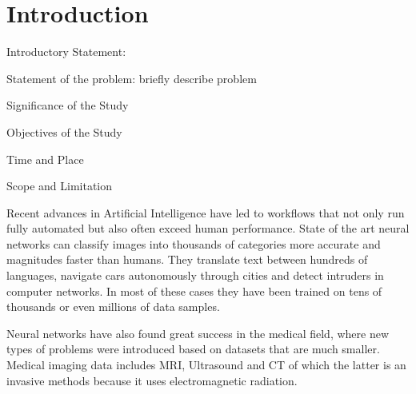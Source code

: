 \section{Introduction}

Introductory Statement: 

Statement of the problem: briefly describe problem

Significance of the Study

Objectives of the Study

Time and Place

Scope and Limitation

Recent advances in Artificial Intelligence have led to workflows that not only run fully automated but also often exceed human performance. State of the art neural networks can classify images into thousands of categories more accurate and magnitudes faster than humans. They translate text between hundreds of languages, navigate cars autonomously through cities and detect intruders in computer networks. In most of these cases they have been trained on tens of thousands or even millions of data samples.

Neural networks have also found great success in the medical field, where new types of problems were introduced based on datasets that are much smaller. Medical imaging data includes MRI, Ultrasound and CT of which the latter is an invasive methods because it uses electromagnetic radiation.

\newpage
